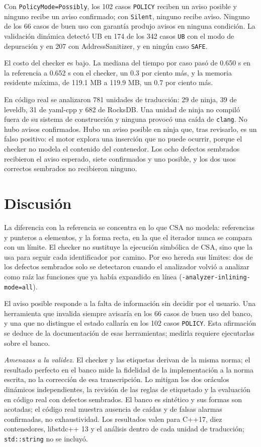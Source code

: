 \documentclass[conference]{IEEEtran}
\newcommand{\code}[1]{\texttt{#1}}
\begin{document}
Con \code{PolicyMode=Possibly}, los 102 casos \code{POLICY} reciben un aviso posible y ninguno recibe un aviso confirmado; con \code{Silent}, ninguno recibe aviso. Ninguno de los 66 casos de buen uso con garantía produjo avisos en ninguna condición. La validación dinámica detectó UB en 174 de los 342 casos \code{UB} con el modo de depuración y en 207 con AddressSanitizer, y en ningún caso \code{SAFE}.

El costo del checker es bajo. La mediana del tiempo por caso pasó de 0.650 s en la referencia a 0.652 s con el checker, un 0.3 por ciento más, y la memoria residente máxima, de 119.1 MB a 119.9 MB, un 0.7 por ciento más.

En código real se analizaron 781 unidades de traducción: 29 de ninja, 39 de leveldb, 31 de yaml-cpp y 682 de RocksDB. Una unidad de ninja no compiló fuera de su sistema de construcción y ninguna provocó una caída de \code{clang}. No hubo avisos confirmados. Hubo un aviso posible en ninja que, tras revisarlo, es un falso positivo: el motor explora una inserción que no puede ocurrir, porque el checker no modela el contenido del contenedor. Los ocho defectos sembrados recibieron el aviso esperado, siete confirmados y uno posible, y los dos usos correctos sembrados no recibieron ninguno.

\section{Discusión}

La diferencia con la referencia se concentra en lo que CSA no modela: referencias y punteros a elementos, y la forma recta, en la que el iterador nunca se compara con un límite. El checker no sustituye la ejecución simbólica de CSA, sino que la usa para seguir cada identificador por camino. Por eso hereda sus límites: dos de los defectos sembrados solo se detectaron cuando el analizador volvió a analizar como raíz las funciones que ya había expandido en línea (\code{-analyzer-inlining-mode=all}).

El aviso posible responde a la falta de información sin decidir por el usuario. Una herramienta que invalida siempre avisaría en los 66 casos de buen uso del banco, y una que no distingue el estado callaría en los 102 casos \code{POLICY}. Esta afirmación se deduce de la documentación de esas herramientas; medirla requiere ejecutarlas sobre el banco.

\textit{Amenazas a la validez.} El checker y las etiquetas derivan de la misma norma; el resultado perfecto en el banco mide la fidelidad de la implementación a la norma escrita, no la corrección de esa transcripción. Lo mitigan los dos oráculos dinámicos independientes, la revisión de las reglas de etiquetado y la evaluación en código real con defectos sembrados. El banco es sintético y sus formas son acotadas; el código real muestra ausencia de caídas y de falsas alarmas confirmadas, no exhaustividad. Los resultados valen para C++17, diez contenedores, libstdc++ 13 y el análisis dentro de cada unidad de traducción; \code{std::string} no se incluyó.
\end{document}
